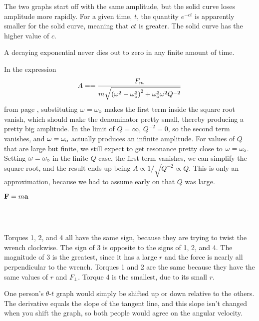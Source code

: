 The two graphs start off with the same amplitude, but the solid curve loses
amplitude more rapidly. For a given time, $t$, the quantity $e^{-ct}$ is apparently
smaller for the solid curve, meaning that $ct$ is greater. The solid curve has
the higher value of $c$.

A decaying exponential never dies out to zero in any finite amount of time.

In the expression 
\begin{equation*}
		A = 
			= \frac{F_m}{m\sqrt{\left(\omega^2-\omega_{\textup{o}}^2\right)^2
				+\omega_{\textup{o}}^2\omega^2Q^{-2}}}
\end{equation*}
from page \pageref{resonance-amplitude}, substituting $\omega=\omega_{\textup{o}}$ makes the first
term inside the square root vanish, which should make the denominator pretty small, thereby
producing a pretty big amplitude. In the limit of $Q=\infty$, $Q^{-2}=0$, so the second term
vanishes, and $\omega=\omega_{\textup{o}}$ actually produces an infinite amplitude. For values of $Q$
that are large but finite, we still expect to get resonance pretty close to $\omega=\omega_{\textup{o}}$.
Setting $\omega=\omega_{\textup{o}}$ in the finite-$Q$ case, the first
term vanishes, we can simplify the square root, and the result ends up being $A\propto 1/\sqrt{Q^{-2}}\propto Q$.
This is only an approximation, because we had to assume early on that $Q$ was large.

 $\textbf{F}=m\textbf{a}$

 \\
\begin{center}\end{center}

\noindent{}\\
 Torques 1, 2, and 4 all have the same sign, because they are trying to twist the wrench clockwise. The sign of 3 is opposite to the signs of 1, 2, and 4. The magnitude of 3 is the greatest, since it has a large $r$ and the force is nearly all perpendicular to the wrench. Torques 1 and 2 are the same because they have the same values of $r$ and $F_{\perp}$. Torque 4 is the smallest, due to its small $r$.

 One person's $\theta$-$t$ graph would simply be shifted up or
down relative to the others. The derivative equals the slope of the tangent line,
and this slope isn't changed when you shift the graph, so both people would agree
on the angular velocity.


